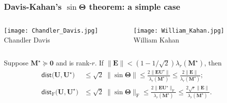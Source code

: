 \documentclass[compress,
mathserif,wide,%
]{beamer}
\begin{document}
\begin{frame}
\frametitle{Davis-Kahan's $\sin\bm{\Theta}$ theorem: a simple case}

\vspace{-0.5em}

\begin{columns}
	\begin{column}{0.35\textwidth}
		\begin{center}
			\texttt{[image: Chandler\_Davis.jpg]} \\
			{\footnotesize  Chandler Davis}
		\end{center}
	\end{column}
	\begin{column}{0.35\textwidth}
		\begin{center}
			\texttt{[image: William\_Kahan.jpg]} \\
			{\footnotesize William Kahan}
		\end{center}
	\end{column}


\end{columns}

\begin{theorem} \label{thm:sin-Theta}
Suppose $\bm{M}^\star \succeq \bm{0}$ and is rank-$r$. If $\|\bm{E}\| < (1 - 1/ \sqrt{2}) \lambda_{r}(\bm{M}^\star)$, then
\begin{subequations}
\label{eq:davis-kahan-conclusion-corollary}
\begin{align*}
\mathsf{dist}\big(\bm{U},\bm{U}^{\star}\big) & \leq\sqrt{2}\;\|\sin\bm{\Theta}\|\leq\frac{2 \big\|\bm{E}\bm{U}^{\star}\big\|}{\lambda_{r}(\bm{M}^\star)}\leq\frac{2\|\bm{E}\|}{\lambda_{r}(\bm{M}^\star)};\\
	\mathsf{dist}_{\mathrm{F}}\big(\bm{U},\bm{U}^{\star}\big) & \leq\sqrt{2}\;\|\sin\bm{\Theta}\|_{\mathrm{F}}\leq\frac{2 \big\|\bm{E}\bm{U}^{\star}\big\|_{\mathrm{F}}}{\lambda_{r}(\bm{M}^\star)}\leq\frac{2\sqrt{r}\|\bm{E}\|}{\lambda_{r}(\bm{M}^\star)}.
\end{align*}
\end{subequations}
%
\end{theorem}

\end{frame}
\end{document}

